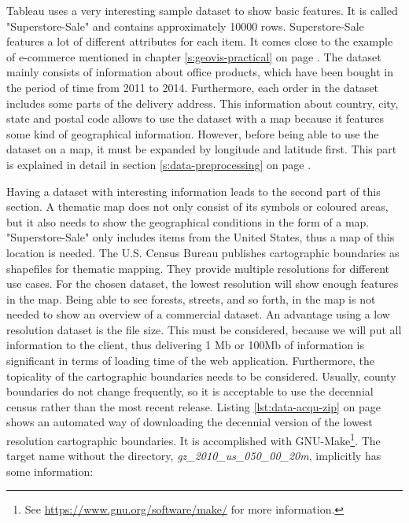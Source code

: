 Tableau uses a very interesting sample dataset to show basic features. It is called "Superstore-Sale" and contains approximately 10000 rows. Superstore-Sale features a lot of different attributes for each item. It comes close to the example of e-commerce mentioned in chapter \ref{s:geovis-practical} on page \pageref{s:geovis-practical}. The dataset mainly consists of information about office products, which have been bought in the period of time from 2011 to 2014. Furthermore, each order in the dataset includes some parts of the delivery address. This information about country, city, state and postal code allows to use the dataset with a map because it features some kind of geographical information. However, before being able to use the dataset on a map, it must be expanded by longitude and latitude first. This part is explained in detail in section \ref{s:data-preprocessing} on page \pageref{s:data-preprocessing}.

Having a dataset with interesting information leads to the second part of this section. A thematic map does not only consist of its symbols or coloured areas, but it also needs to show the geographical conditions in the form of a map. "Superstore-Sale" only includes items from the United States, thus a map of this location is needed. The U.S. Census Bureau publishes cartographic boundaries as shapefiles for thematic mapping. They provide multiple resolutions for different use cases. For the chosen dataset, the lowest resolution will show enough features in the map. Being able to see forests, streets, and so forth, in the map is not needed to show an overview of a commercial dataset. An advantage using a low resolution dataset is the file size. This must be considered, because we will put all information to the client, thus delivering 1 \ac{Mb} or 100\ac{Mb} of information is significant in terms of loading time of the web application.
Furthermore, the topicality of the cartographic boundaries needs to be considered. Usually, county boundaries do not change frequently, so it is acceptable to use the decennial census rather than the most recent release. Listing \ref{lst:data-acqu-zip} on page \pageref{lst:data-acqu-zip} shows an automated way of downloading the decennial version of the lowest resolution cartographic boundaries. It is accomplished with GNU-Make\footnote{See \href{https://www.gnu.org/software/make/}{https://www.gnu.org/software/make/} for more information.}. The target name without the directory, \textit{gz\_2010\_us\_050\_00\_20m}, implicitly has some information:

